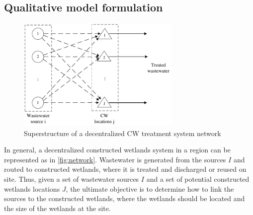 \documentclass[preprint,12pt,authoryear]{elsarticle}
\begin{document}
%
%
%
%

\subsection{Qualitative model formulation}\label{section:problemstatement}

\begin{figure}[!htpb]
	\centering
	\includegraphics[width=0.7\textwidth]{CWnetwork.pdf}
	\caption{Superstructure of a decentralized CW treatment system network}
	\label{fig:network}
\end{figure}

In general, a decentralized constructed wetlands system in a region can be represented as in \autoref{fig:network}. Wastewater is generated from the sources $I$ and routed to constructed wetlands, where it is treated and discharged or reused on site. Thus, given a set of wastewater sources $I$ and a set of potential constructed wetlands locations $J$, the ultimate objective is to determine how to link the sources to the constructed wetlands, where the wetlands should be located and the size of the wetlands at the site. 
\end{document}
